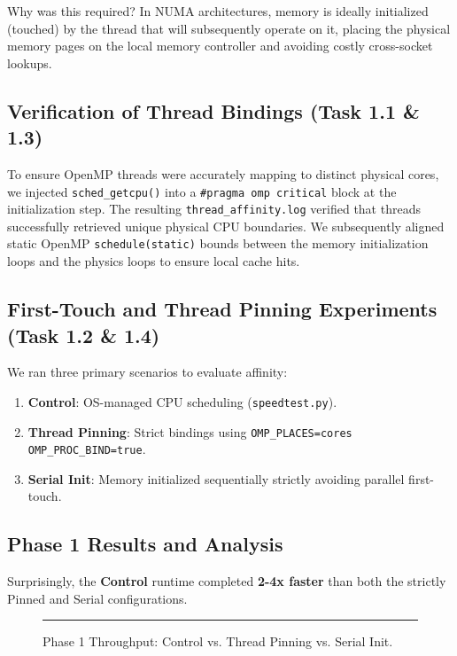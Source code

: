 \documentclass[11pt,a4paper]{article}
\begin{document}
Why was this required? In NUMA architectures, memory is ideally initialized (touched) by the thread that will subsequently operate on it, placing the physical memory pages on the local memory controller and avoiding costly cross-socket lookups.

\subsection{Verification of Thread Bindings (Task 1.1 \& 1.3)}
To ensure OpenMP threads were accurately mapping to distinct physical cores, we injected \texttt{sched\_getcpu()} into a \texttt{\#pragma omp critical} block at the initialization step. The resulting \texttt{thread\_affinity.log} verified that threads successfully retrieved unique physical CPU boundaries. We subsequently aligned static OpenMP \texttt{schedule(static)} bounds between the memory initialization loops and the physics loops to ensure local cache hits.

\subsection{First-Touch and Thread Pinning Experiments (Task 1.2 \& 1.4)}
We ran three primary scenarios to evaluate affinity:
\begin{enumerate}
    \item \textbf{Control}: OS-managed CPU scheduling (\texttt{speedtest.py}).
    \item \textbf{Thread Pinning}: Strict bindings using \texttt{OMP\_PLACES=cores OMP\_PROC\_BIND=true}.
    \item \textbf{Serial Init}: Memory initialized sequentially strictly avoiding parallel first-touch.
\end{enumerate}

\subsection{Phase 1 Results and Analysis}
Surprisingly, the \textbf{Control} runtime completed \textbf{2-4x faster} than both the strictly Pinned and Serial configurations. 

\begin{figure}[htbp]
    \centering
    \rule{0.8\linewidth}{4cm} %
    \caption{Phase 1 Throughput: Control vs. Thread Pinning vs. Serial Init.}
    \label{fig:phase1_results}
\end{figure}
\end{document}
